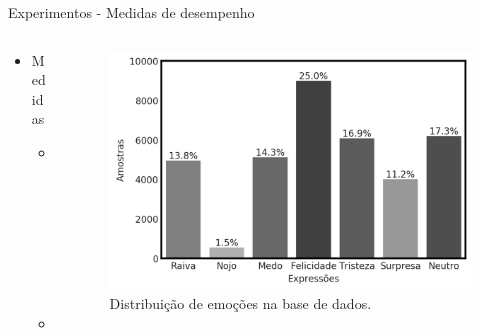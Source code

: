 \begin{frame}{Experimentos - Medidas de desempenho}

    \begin{columns}
    \begin{column}{0.3\textwidth}
      \begin{itemize}
        \item Medidas
        \begin{itemize}
            \item F1-Score
            \item Acurácia
        \end{itemize}
      \end{itemize}
    \end{column}
    
    \begin{column}{0.7\textwidth}
        \begin{figure}
    \centering
    \includegraphics[width=0.9\linewidth]{img/expression_distribution.png}
    \caption{Distribuição de emoções na base de dados.}
  \end{figure}
    \end{column}
    
\end{columns} 

\end{frame}